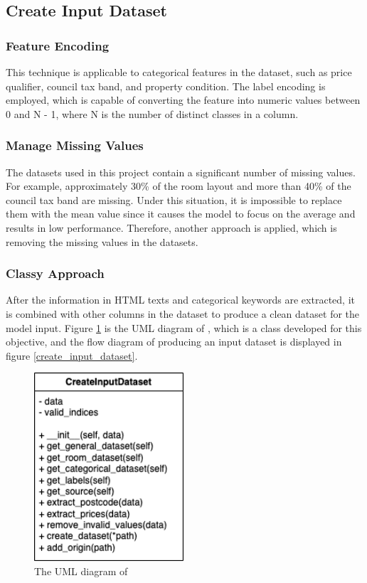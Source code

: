 \documentclass[12pt,twoside]{report}
\begin{document}
\subsection{Create Input Dataset}
\label{create_input_dataset_section}
\subsubsection{Feature Encoding}
This technique is applicable to categorical features in the dataset, such as price qualifier, council tax band, and property condition. The label encoding is employed, which is capable of converting the feature into numeric values between 0 and N - 1, where N is the number of distinct classes in a column.

\subsubsection{Manage Missing Values}
The datasets used in this project contain a significant number of missing values. For example, approximately 30\% of the room layout and more than 40\% of the council tax band are missing. Under this situation, it is impossible to replace them with the mean value since it causes the model to focus on the average and results in low performance. Therefore, another approach is applied, which is removing the missing values in the datasets. 

\subsubsection{Classy Approach}
After the information in HTML texts and categorical keywords are extracted, it is combined with other columns in the dataset to produce a clean dataset for the model input.  Figure \ref{uml_create_input_dataset} is the UML diagram of , which is a class developed for this objective, and the flow diagram of producing an input dataset is displayed in figure \ref{create_input_dataset}.

\begin{figure}[!htbp]
	\centering
	\includegraphics[height=7cm]{uml_create_input_dataset}
	\caption{The UML diagram of }
	\label{uml_create_input_dataset}
\end{figure}
\end{document}
